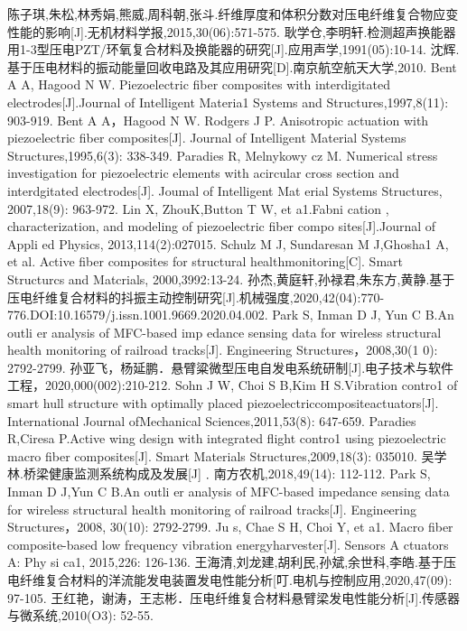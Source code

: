 \documentclass[lang=cn,11pt,a4paper,cite=authoryear]{elegantpaper}
\begin{document}
\begin{thebibliography}{99}  

  陈子琪,朱松,林秀娟,熊威,周科朝,张斗.纤维厚度和体积分数对压电纤维复合物应变性能的影响[J].无机材料学报,2015,30(06):571-575.
  耿学仓,李明轩.检测超声换能器用1-3型压电PZT/环氧复合材料及换能器的研究[J].应用声学,1991(05):10-14.
  沈辉. 基于压电材料的振动能量回收电路及其应用研究[D].南京航空航天大学,2010.
  Bent A A, Hagood N W. Piezoelectric fiber composites with interdigitated electrodes[J].Journal of Intelligent Materia1 Systems and Structures,1997,8(11): 903-919.
  Bent A A，Hagood N W. Rodgers J P. Anisotropic actuation with piezoelectric fiber composites[J]. Journal of Intelligent Material Systems Structures,1995,6(3): 338-349.
  Paradies R, Melnykowy cz M. Numerical stress investigation for piezoelectric elements with acircular cross section and interdgitated electrodes[J]. Joumal of Intelligent Mat erial Systems Structures, 2007,18(9): 963-972. 
  Lin X, ZhouK,Button T W, et a1.Fabni cation , characterization, and modeling of piezoelectric fiber compo sites[J].Journal of Appli ed Physics, 2013,114(2):027015.
  Schulz M J, Sundaresan M J,Ghosha1 A, et al. Active fiber composites for structural healthmonitoring[C]. Smart Structurcs and Matcrials, 2000,3992:13-24.
  孙杰,黄庭轩,孙禄君,朱东方,黄静.基于压电纤维复合材料的抖振主动控制研究[J].机械强度,2020,42(04):770-776.DOI:10.16579/j.issn.1001.9669.2020.04.002.
  Park S, Inman D J, Yun C B.An outli er analysis of MFC-based imp edance sensing data for wireless structural health monitoring of railroad tracks[J]. Engineering Structures，2008,30(1 0): 2792-2799.
  孙亚飞，杨延鹏．悬臂粱微型压电自发电系统研制[J].电子技术与软件工程，2020,000(002):210-212.
  Sohn J W, Choi S B,Kim H S.Vibration contro1 of smart hull structure with optimally placed piezoelectriccompositeactuators[J]. International Journal ofMechanical Sciences,2011,53(8): 647-659.
  Paradies R,Ciresa P.Active wing design with integrated flight contro1 using piezoelectric macro fiber composites[J]. Smart Materials Structures,2009,18(3): 035010.  
  吴学林.桥梁健康监测系统构成及发展[J]﹒南方农机,2018,49(14): 112-112.
  Park S, Inman D J,Yun C B.An outli er analysis of MFC-based impedance sensing data for wireless structural health monitoring of railroad tracks[J]. Engineering Structures，2008, 30(10): 2792-2799.  
  Ju s, Chae S H, Choi Y, et a1. Macro fiber composite-based low frequency vibration energyharvester[J]. Sensors A ctuators A: Phy si ca1, 2015,226: 126-136.
  王海清,刘龙建,胡利民,孙斌,余世科,李皓.基于压电纤维复合材料的洋流能发电装置发电性能分析[叮.电机与控制应用,2020,47(09): 97-105.
  王红艳，谢涛，王志彬．压电纤维复合材料悬臂梁发电性能分析[J].传感器与微系统,2010(O3): 52-55.


\end{thebibliography}
\end{document}
